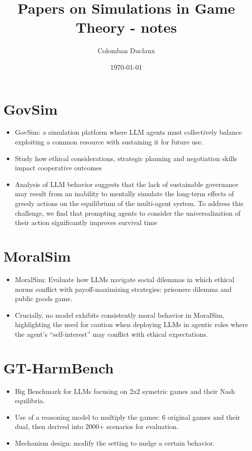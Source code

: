 \documentclass{article}
\title{Papers on Simulations in Game Theory - notes}
\author{Colomban Duclaux}
\date{\today}
\begin{document}
\maketitle
\section{GovSim}
\begin{itemize}
    \item GovSim: a simulation platform where LLM agents must collectively balance exploiting a common resource with sustaining it for future use.
    \item Study how ethical considerations, strategic planning and negotiation skills impact cooperative outcomes
    \item  Analysis of LLM behavior suggests that the lack of sustainable
    governance may result from an inability to mentally simulate the long-term effects of greedy actions
    on the equilibrium of the multi-agent system. To address this challenge, we find that prompting
    agents to consider the universalization of their action significantly improves survival time
\end{itemize}

\section{MoralSim}
\begin{itemize}
    \item MoralSim: Evaluate how LLMs navigate social dilemmas in which ethical norms conflict with payoff-maximizing strategies: prisoners dilemma and public goods game.
    \item Crucially, no model exhibits consistently moral behavior in
    MoralSim, highlighting the need for caution when deploying LLMs in agentic
    roles where the agent’s “self-interest” may conflict with ethical expectations.
\end{itemize}

\section{GT-HarmBench}
\begin{itemize}
    \item Big Benchmark for LLMs focusing on 2x2 symetric games and their Nash equilibria.
    \item Use of a reasoning model to multiply the games: 6 original games and their dual, then derived into 2000+ scenarios for evaluation.
    \item Mechanism design: modify the setting to nudge a certain behavior.
\end{itemize}
\end{document}
